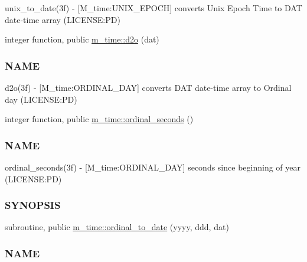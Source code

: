 \begin{DoxyCompactItemize}
\begin{DoxyCompactList}
unix\+\_\+to\+\_\+date(3f) -\/ \mbox{[}M\+\_\+time\+:U\+N\+I\+X\+\_\+\+E\+P\+O\+CH\mbox{]} converts Unix Epoch Time to D\+AT date-\/time array (L\+I\+C\+E\+N\+SE\+:PD) \end{DoxyCompactList}\item 
integer function, public \mbox{\hyperlink{namespacem__time_a727dd77bbd4a5d0e3947c5d303845947}{m\+\_\+time\+::d2o}} (dat)
\begin{DoxyCompactList}\small\item\em \subsubsection*{N\+A\+ME}

d2o(3f) -\/ \mbox{[}M\+\_\+time\+:O\+R\+D\+I\+N\+A\+L\+\_\+\+D\+AY\mbox{]} converts D\+AT date-\/time array to Ordinal day (L\+I\+C\+E\+N\+SE\+:PD) \end{DoxyCompactList}\item 
integer function, public \mbox{\hyperlink{namespacem__time_ab8960d2aa60e134bcf77247d8b257963}{m\+\_\+time\+::ordinal\+\_\+seconds}} ()
\begin{DoxyCompactList}\small\item\em \subsubsection*{N\+A\+ME}

ordinal\+\_\+seconds(3f) -\/ \mbox{[}M\+\_\+time\+:O\+R\+D\+I\+N\+A\+L\+\_\+\+D\+AY\mbox{]} seconds since beginning of year (L\+I\+C\+E\+N\+SE\+:PD) \subsubsection*{S\+Y\+N\+O\+P\+S\+IS}\end{DoxyCompactList}\item 
subroutine, public \mbox{\hyperlink{namespacem__time_aa4dca4409bf20a011bb04988c1335d63}{m\+\_\+time\+::ordinal\+\_\+to\+\_\+date}} (yyyy, ddd, dat)
\begin{DoxyCompactList}\small\item\em \subsubsection*{N\+A\+ME}


\end{DoxyCompactList}
\end{DoxyCompactItemize}
